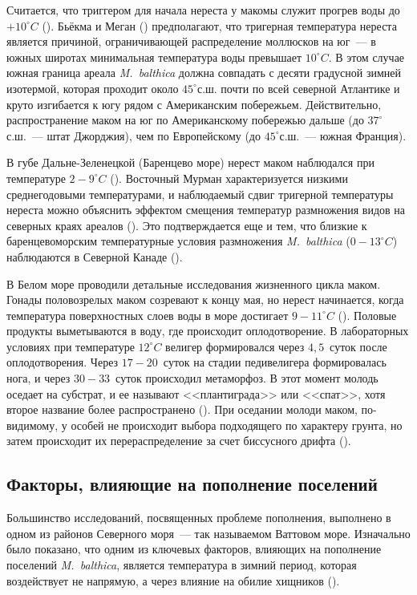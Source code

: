 Считается, что триггером для начала нереста у макомы служит прогрев воды до $+10^{\circ}C$ (\cite{Maximovich_1985, Semenova_1980, Kaufman_1977}).  
Бьёкма и Меган (\cite{Beukema_Meehan_1985}) предполагают, что тригерная температура нереста является причиной, ограничивающей распределение моллюсков на юг~--- в южных широтах минимальная температура воды превышает $10^{\circ}C$. 
В этом случае южная граница ареала \textit{M.~balthica} должна совпадать с десяти градусной зимней изотермой, которая проходит около $45^{\circ}$с.ш. почти по всей северной Атлантике и круто изгибается к югу рядом с Американским побережьем. 
Действительно, распространение маком на юг по Американскому побережью дальше (до $37^{\circ}$с.ш.~--- штат Джорджия), чем по Европейскому (до $45^{\circ}$с.ш.~---  южная Франция).

В губе Дальне-Зеленецкой (Баренцево море) нерест маком наблюдался при температуре $2-9^{\circ}C$ (\cite{Agarova_1974}). 
Восточный Мурман характеризуется низкими среднегодовыми температурами, и наблюдаемый сдвиг тригерной температуры нереста можно объяснить эффектом смещения температур размножения видов на северных краях ареалов (\cite{Thorson_1946}). 
Это подтверждается еще и тем, что близкие к баренцевоморским температурные условия размножения \textit{M.~balthica} ($0-13^{\circ}C$) наблюдаются в Северной Канаде (\cite{Gilbert_1978}).

В Белом море проводили детальные исследования жизненного цикла маком. 
Гонады половозрелых маком созревают к концу мая, но нерест начинается, когда температура поверхностных слоев воды в море достигает $9-11^{\circ}C$  (\cite{Maximovich_1985, Flyachinskaya_1999}). 
Половые продукты выметываются в воду, где происходит оплодотворение. 
В лабораторных условиях при температуре $12^{\circ}C$ велигер формировался через $4,5$~суток после оплодотворения. 
Через $17-20$~суток на стадии педивелигера формировалась нога, и через 3$0-33$~суток происходил метаморфоз. 
В этот момент молодь оседает на субстрат, и ее называют <<плантиграда>> или <<спат>>, хотя второе название более распространено (\cite{Flyachinskaya_1999}). 
При оседании молоди маком, по-видимому, у особей не происходит выбора подходящего по характеру грунта, но затем происходит их перераспределение за счет биссусного дрифта (\cite{Armonies_Hellwig-Armonies_1992, Huxham_Richards_2003}). 


\subsection{Факторы, влияющие на пополнение поселений}
Большинство исследований, посвященных проблеме пополнения, выполнено в одном из районов Северного моря~--- так называемом Ваттовом море.	
Изначально было показано, что одним из ключевых факторов, влияющих на пополнение поселений \textit{M.~balthica}, является температура в зимний период, которая воздействует не напрямую, а через влияние на обилие хищников (\cite{Beukema_et_al_1998, Beukema_Dekker_2014, Dekker_Beukema_2014}).

